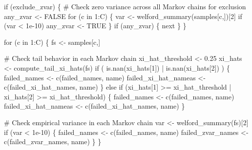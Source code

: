 \documentclass[
  letterpaper,
  DIV=11,
  numbers=noendperiod]{scrartcl}
\newenvironment{Shaded}{\begin{snugshade}}{\end{snugshade}}
\newcommand{\CommentTok}[1]{\textcolor[rgb]{0.37,0.37,0.37}{#1}}
\newcommand{\ConstantTok}[1]{\textcolor[rgb]{0.56,0.35,0.01}{#1}}
\newcommand{\ControlFlowTok}[1]{\textcolor[rgb]{0.00,0.23,0.31}{#1}}
\newcommand{\DecValTok}[1]{\textcolor[rgb]{0.68,0.00,0.00}{#1}}
\newcommand{\FloatTok}[1]{\textcolor[rgb]{0.68,0.00,0.00}{#1}}
\newcommand{\FunctionTok}[1]{\textcolor[rgb]{0.28,0.35,0.67}{#1}}
\newcommand{\NormalTok}[1]{\textcolor[rgb]{0.00,0.23,0.31}{#1}}
\newcommand{\OtherTok}[1]{\textcolor[rgb]{0.00,0.23,0.31}{#1}}
\newcommand{\SpecialCharTok}[1]{\textcolor[rgb]{0.37,0.37,0.37}{#1}}
\begin{document}
\begin{Shaded}
\begin{Highlighting}[]
    \ControlFlowTok{if}\NormalTok{ (exclude\_zvar) \{}
      \CommentTok{\# Check zero variance across all Markov chains for exclusion}
\NormalTok{      any\_zvar }\OtherTok{\textless{}{-}} \ConstantTok{FALSE}
      \ControlFlowTok{for}\NormalTok{ (c }\ControlFlowTok{in} \DecValTok{1}\SpecialCharTok{:}\NormalTok{C) \{}
\NormalTok{        var }\OtherTok{\textless{}{-}} \FunctionTok{welford\_summary}\NormalTok{(samples[c,])[}\DecValTok{2}\NormalTok{]}
        \ControlFlowTok{if}\NormalTok{ (var }\SpecialCharTok{\textless{}} \FloatTok{1e{-}10}\NormalTok{)}
\NormalTok{          any\_zvar }\OtherTok{\textless{}{-}} \ConstantTok{TRUE}
\NormalTok{      \}}
      \ControlFlowTok{if}\NormalTok{ (any\_zvar) \{}
        \ControlFlowTok{next}
\NormalTok{      \}}
\NormalTok{    \}}

    \ControlFlowTok{for}\NormalTok{ (c }\ControlFlowTok{in} \DecValTok{1}\SpecialCharTok{:}\NormalTok{C) \{}
\NormalTok{      fs }\OtherTok{\textless{}{-}}\NormalTok{ samples[c,]}
      
      \CommentTok{\# Check tail behavior in each Markov chain}
\NormalTok{      xi\_hat\_threshold }\OtherTok{\textless{}{-}} \FloatTok{0.25}
\NormalTok{      xi\_hats }\OtherTok{\textless{}{-}} \FunctionTok{compute\_tail\_xi\_hats}\NormalTok{(fs)}
      \ControlFlowTok{if}\NormalTok{ ( }\FunctionTok{is.nan}\NormalTok{(xi\_hats[}\DecValTok{1}\NormalTok{]) }\SpecialCharTok{|} \FunctionTok{is.nan}\NormalTok{(xi\_hats[}\DecValTok{2}\NormalTok{]) ) \{}
\NormalTok{        failed\_names }\OtherTok{\textless{}{-}} \FunctionTok{c}\NormalTok{(failed\_names, name)}
\NormalTok{        failed\_xi\_hat\_nameas }\OtherTok{\textless{}{-}} \FunctionTok{c}\NormalTok{(failed\_xi\_hat\_names, name)}
\NormalTok{      \} }\ControlFlowTok{else} \ControlFlowTok{if}\NormalTok{ (xi\_hats[}\DecValTok{1}\NormalTok{] }\SpecialCharTok{\textgreater{}=}\NormalTok{ xi\_hat\_threshold }\SpecialCharTok{|} 
\NormalTok{                 xi\_hats[}\DecValTok{2}\NormalTok{] }\SpecialCharTok{\textgreater{}=}\NormalTok{ xi\_hat\_threshold) \{}
\NormalTok{        failed\_names }\OtherTok{\textless{}{-}} \FunctionTok{c}\NormalTok{(failed\_names, name)}
\NormalTok{        failed\_xi\_hat\_nameas }\OtherTok{\textless{}{-}} \FunctionTok{c}\NormalTok{(failed\_xi\_hat\_names, name)}
\NormalTok{      \}}
      
      \CommentTok{\# Check empirical variance in each Markov chain}
\NormalTok{      var }\OtherTok{\textless{}{-}} \FunctionTok{welford\_summary}\NormalTok{(fs)[}\DecValTok{2}\NormalTok{]}
      \ControlFlowTok{if}\NormalTok{ (var }\SpecialCharTok{\textless{}} \FloatTok{1e{-}10}\NormalTok{) \{}
\NormalTok{        failed\_names }\OtherTok{\textless{}{-}} \FunctionTok{c}\NormalTok{(failed\_names, name)}
\NormalTok{        failed\_zvar\_names }\OtherTok{\textless{}{-}} \FunctionTok{c}\NormalTok{(failed\_zvar\_names, name) }
\NormalTok{      \}}
\NormalTok{    \}}


\end{Highlighting}
\end{Shaded}
\end{document}
